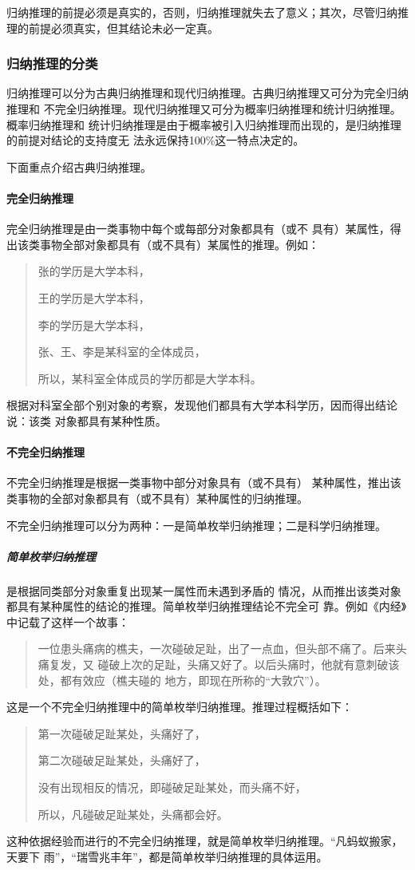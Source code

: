 \documentclass[final,oneside]{ctexbook}
\newenvironment{equotation}{\begin{quotation}\kaishu}{\end{quotation}}
\begin{document}
归纳推理的前提必须是真实的，否则，归纳推理就失去了意义；其次，尽管归纳推理的前提必须真实，但其结论未必一定真。

\subsubsection{归纳推理的分类}

归纳推理可以分为古典归纳推理和现代归纳推理。古典归纳推理又可分为完全归纳推理和
不完全归纳推理。现代归纳推理又可分为概率归纳推理和统计归纳推理。概率归纳推理和
统计归纳推理是由于概率被引入归纳推理而出现的，是归纳推理的前提对结论的支持度无
法永远保持100\%这一特点决定的。

下面重点介绍古典归纳推理。

\paragraph{完全归纳推理}完全归纳推理是由一类事物中每个或每部分对象都具有（或不
具有）某属性，得出该类事物全部对象都具有（或不具有）某属性的推理。例如：
\begin{equotation}
  张的学历是大学本科，

  王的学历是大学本科，

  李的学历是大学本科，

  张、王、李是某科室的全体成员，

  所以，某科室全体成员的学历都是大学本科。
\end{equotation}
根据对科室全部个别对象的考察，发现他们都具有大学本科学历，因而得出结论说：该类
对象都具有某种性质。

\paragraph{不完全归纳推理}不完全归纳推理是根据一类事物中部分对象具有（或不具有）
某种属性，推出该类事物的全部对象都具有（或不具有）某种属性的归纳推理。

不完全归纳推理可以分为两种：一是简单枚举归纳推理；二是科学归纳推理。

\subparagraph{简单枚举归纳推理}是根据同类部分对象重复出现某一属性而未遇到矛盾的
情况，从而推出该类对象都具有某种属性的结论的推理。简单枚举归纳推理结论不完全可
靠。例如《内经》中记载了这样一个故事：
\begin{equotation}
  一位患头痛病的樵夫，一次碰破足趾，出了一点血，但头部不痛了。后来头痛复发，又
  碰破上次的足趾，头痛又好了。以后头痛时，他就有意刺破该处，都有效应（樵夫碰的
  地方，即现在所称的“大敦穴”）。
\end{equotation}
这是一个不完全归纳推理中的简单枚举归纳推理。推理过程概括如下：
\begin{equotation}
  第一次碰破足趾某处，头痛好了，

  第二次碰破足趾某处，头痛好了，

  没有出现相反的情况，即碰破足趾某处，而头痛不好，

  所以，凡碰破足趾某处，头痛都会好。
\end{equotation}
这种依据经验而进行的不完全归纳推理，就是简单枚举归纳推理。“凡蚂蚁搬家，天要下
雨”，“瑞雪兆丰年”，都是简单枚举归纳推理的具体运用。
\end{document}
